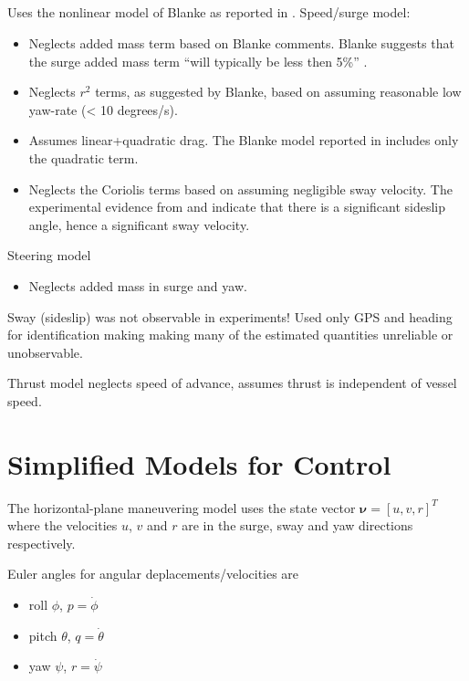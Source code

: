 \documentclass[11pt,draftcls,journal,onecolumn]{IEEEtran}
\begin{document}
\subsection{\cite{caccia08practical}}
Uses the nonlinear model of Blanke \cite{blanke81ship} as reported in \cite{fossen94guidance}.  Speed/surge model:
\begin{itemize}
\item Neglects added mass term based on Blanke comments.  Blanke suggests that the surge added mass term ``will typically be less then 5\%'' \cite{fossen94guidance}.
\item Neglects $r^2$ terms, as suggested by Blanke, based on assuming reasonable low yaw-rate (< 10 degrees/s). 
\item Assumes linear+quadratic drag.  The Blanke model reported in \cite{fossen94guidance} includes only the quadratic term.  
\item Neglects the Coriolis terms based on assuming negligible sway velocity.  The experimental evidence from \cite{sonnenburg13modeling} and \cite{sonnenburg10control} indicate that there is a significant sideslip angle, hence a significant sway velocity.
\end{itemize}
Steering model
\begin{itemize}
\item Neglects added mass in surge and yaw.
\end{itemize}
Sway (sideslip) was not observable in experiments!  Used only GPS and heading for identification making making many of the estimated quantities unreliable or unobservable.

Thrust model neglects speed of advance, assumes thrust is independent of vessel speed.

\section{Simplified Models for Control}
The horizontal-plane maneuvering model uses the state vector $\bm{\nu}=[u,v,r]^T$ where the velocities $u$, $v$ and $r$ are in the surge, sway and yaw directions respectively. 

Euler angles for angular deplacements/velocities are
\begin{itemize}
\item roll $\phi$, $p=\dot{\phi}$
\item pitch $\theta$, $q=\dot{\theta}$
\item yaw $\psi$, $r=\dot{\psi}$
\end{itemize}
\end{document}
